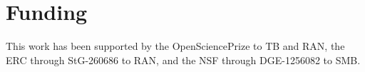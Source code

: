 \documentclass{bioinfo}
\begin{document}
\vspace*{-10pt}

%

\section*{Funding}

This work has been supported by the OpenSciencePrize to TB and RAN, the ERC through StG-260686 to RAN, and the NSF through DGE-1256082 to SMB.

\vspace*{-12pt}



\end{document}

